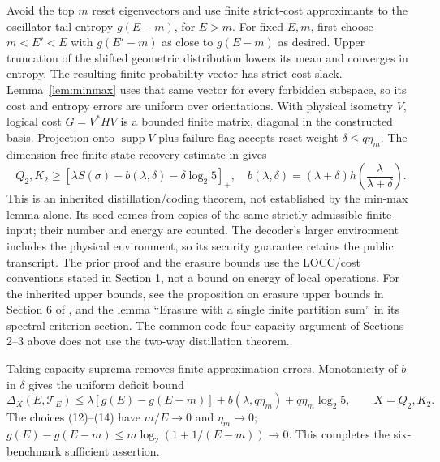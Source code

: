 \documentclass[11pt]{article}
\newcommand{\supp}{\operatorname{supp}}
\newcommand{\Tcal}{\mathcal T}
\begin{document}
Avoid the top \(m\) reset eigenvectors and use finite strict-cost
approximants to the oscillator tail entropy \(g(E-m)\), for \(E>m\).
For fixed \(E,m\), first choose \(m<E\prime<E\) with
\(g(E\prime-m)\) as close to \(g(E-m)\) as desired. Upper truncation
of the shifted geometric distribution lowers its mean and converges in
entropy. The resulting finite probability vector has strict cost slack.
Lemma~\ref{lem:minmax} uses that same vector for every forbidden
subspace, so its cost and entropy errors are uniform over orientations. With physical isometry \(V\), logical cost
\(G=V^*HV\) is a bounded finite matrix, diagonal in the constructed basis.
Projection onto \(\supp V\) plus failure flag accepts reset weight
\(\delta\le q\eta_m\).
The dimension-free finite-state recovery estimate in
\cite[Section 2, theorem ``An arbitrary noisy maximally correlated
component'']{prior} gives
\[
 Q_2,K_2\ge
 [\lambda S(\sigma)-b(\lambda,\delta)-\delta\log_2 5]_+,\quad
 b(\lambda,\delta)=(\lambda+\delta)
                 h\left(\frac{\lambda}{\lambda+\delta}\right). \tag{22}
\]
This is an inherited distillation/coding theorem, not established by
the min-max lemma alone. Its seed comes from copies of the same
strictly admissible finite input; their number and energy are counted.
The decoder's larger environment includes the physical environment,
so its security guarantee retains the public transcript.
The prior proof and the erasure bounds use the LOCC/cost conventions
stated in Section 1, not a bound on energy of local operations.
For the inherited upper bounds, see the proposition on erasure upper
bounds in Section 6 of \cite{prior}, and the lemma ``Erasure with a single
finite partition sum'' in its spectral-criterion section. The common-code
four-capacity argument of Sections 2--3 above does not use the two-way
distillation theorem.

Taking capacity suprema removes finite-approximation errors. Monotonicity
of \(b\) in \(\delta\) gives the uniform deficit bound
\[
 \Delta_X(E,\Tcal_E)\le
 \lambda[g(E)-g(E-m)]+b(\lambda,q\eta_m)+q\eta_m\log_2 5,
 \qquad X=Q_2,K_2.                                           \tag{23}
\]
The choices (12)--(14) have \(m/E\to0\) and \(\eta_m\to0\);
\(g(E)-g(E-m)\le m\log_2(1+1/(E-m))\to0\).
This completes the six-benchmark sufficient assertion.




\end{document}
